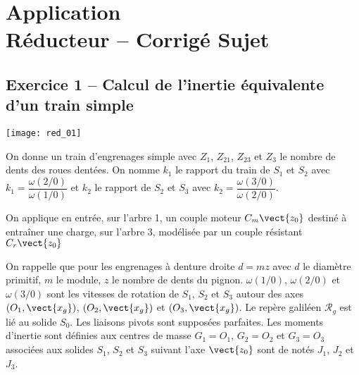 \chapter*{Application  \\ 
Réducteur -- \ifprof Corrigé \else Sujet \fi}


\iflivret {} \else
\ifprof  {} \else \fi
\fi
\setcounter{question}{0}


\begin{marginfigure}
\centering
\end{marginfigure}


\section*{Exercice 1 -- Calcul de l'inertie équivalente d'un train simple}
\setcounter{subparagraph}{0}


\begin{marginfigure}
\texttt{[image: red\_01]}
\end{marginfigure}

On donne un train d'engrenages simple avec $Z_1$, $Z_{21}$, $Z_{23}$ et $Z_3$ le nombre de dents des roues dentées. On nomme $k_1$ le rapport du train de $S_1$ et $S_2$ avec $k_1=\dfrac{\omega(2/0)}{\omega(1/0)}$ et  
$k_2$ le rapport de $S_2$ et $S_3$ avec $k_2=\dfrac{\omega(3/0)}{\omega(2/0)}$. 

On applique en entrée, sur l'arbre 1, un couple moteur $C_m\vect{z_0}$ destiné à entraîner une charge, sur l'arbre 3, modélisée par un couple résistant  $C_r\vect{z_0}$



On rappelle que pour les engrenages à denture droite $d=mz$ avec $d$ le diamètre primitif, $m$ le module, $z$ le nombre de dents du pignon. $\omega(1/0)$, $\omega(2/0)$ et $\omega(3/0)$ sont les vitesses de rotation de $S_1$, $S_2$ et $S_3$ autour des axes $\left(O_1,\vect{x_g}\right)$, $\left(O_2,\vect{x_g}\right)$ et $\left(O_3,\vect{x_g}\right)$. Le repère galiléen $\mathcal{R}_g$ est lié au solide $S_0$. Les liaisons pivots sont supposées parfaites. Les moments d'inertie sont définies aux centres de masse $G_1=O_1$, $G_2=O_2$ et $G_3=O_3$ associées aux solides $S_1$, $S_2$ et $S_3$ suivant l'axe $\vect{z_0}$ sont de notés $J_1$, $J_2$ et $J_3$. 

